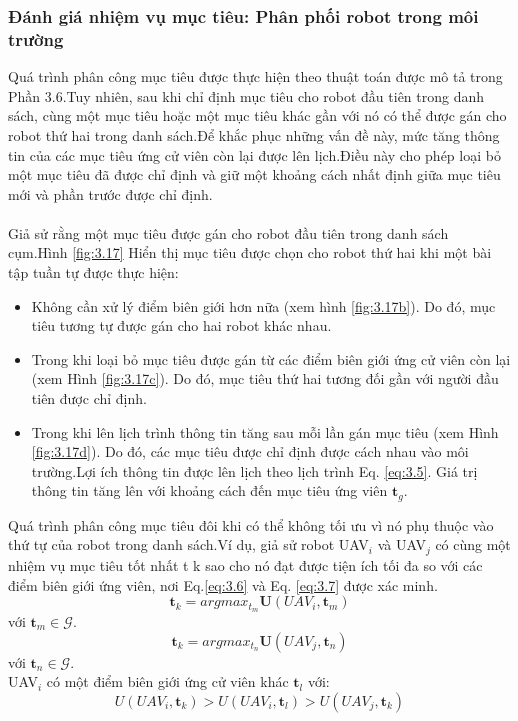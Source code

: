 \documentclass[11pt,openany]{book}
\begin{document}
\begin{algorimth}[H]
\subsubsection{Đánh giá nhiệm vụ mục tiêu: Phân phối robot trong môi trường}
Quá trình phân công mục tiêu được thực hiện theo thuật toán được mô tả trong Phần 3.6.Tuy nhiên, sau khi chỉ định mục tiêu cho robot đầu tiên trong danh sách, cùng một mục tiêu hoặc một mục tiêu khác gần với nó có thể được gán cho robot thứ hai trong danh sách.Để khắc phục những vấn đề này, mức tăng thông tin của các mục tiêu ứng cử viên còn lại được lên lịch.Điều này cho phép loại bỏ một mục tiêu đã được chỉ định và giữ một khoảng cách nhất định giữa mục tiêu mới và phần trước được chỉ định.\\\\
Giả sử rằng một mục tiêu được gán cho robot đầu tiên trong danh sách cụm.Hình \ref{fig:3.17} Hiển thị mục tiêu được chọn cho robot thứ hai khi một bài tập tuần tự được thực hiện:
\begin{itemize}
    \item Không cần xử lý điểm biên giới hơn nữa (xem hình \ref{fig:3.17b}). Do đó, mục tiêu tương tự được gán cho hai robot khác nhau.
    \item Trong khi loại bỏ mục tiêu được gán từ các điểm biên giới ứng cử viên còn lại (xem Hình \ref{fig:3.17c}). Do đó, mục tiêu thứ hai tương đối gần với người đầu tiên được chỉ định.
    \item Trong khi lên lịch trình thông tin tăng sau mỗi lần gán mục tiêu (xem Hình \ref{fig:3.17d}). Do đó, các mục tiêu được chỉ định được cách nhau vào môi trường.Lợi ích thông tin được lên lịch theo lịch trình Eq. \ref{eq:3.5}. Giá trị thông tin tăng lên với khoảng cách đến mục tiêu ứng viên $\mathbf{t}_g$.
\end{itemize}
Quá trình phân công mục tiêu đôi khi có thể không tối ưu vì nó phụ thuộc vào thứ tự của robot trong danh sách.Ví dụ, giả sử robot UAV$_i$ và UAV$_j$ có cùng một nhiệm vụ mục tiêu tốt nhất t k sao cho nó đạt được tiện ích tối đa so với các điểm biên giới ứng viên, nơi Eq.\ref{eq:3.6} và Eq. \ref{eq:3.7} được xác minh.
\begin{equation}\label{eq:3.6}
    \mathbf{t}_k=argmax_{t_m}\mathbf{U}(UAV_i,\mathbf{t}_m)
\end{equation}
với $\mathbf{t}_m \in \mathcal{G}$.
\begin{equation}\label{eq:3.7}
    \mathbf{t}_k=argmax_{t_n}\mathbf{U}(UAV_j, \mathbf{t}_n)
\end{equation}
với $\mathbf{t}_n \in \mathcal{G}$.\\
UAV$_i$ có một điểm biên giới ứng cử viên khác $\mathbf{t}_l$ với:
\begin{equation}\label{eq:3.8}
    \mathbf{\mathit{U}}(UAV_i, \mathbf{t}_k) > \mathbf{\mathit{U}}(UAV_i,\mathbf{t}_l) > \mathbf{\mathit{U}}(UAV_j, \mathbf{t}_k)
\end{equation}


\end{algorimth}
\end{document}
